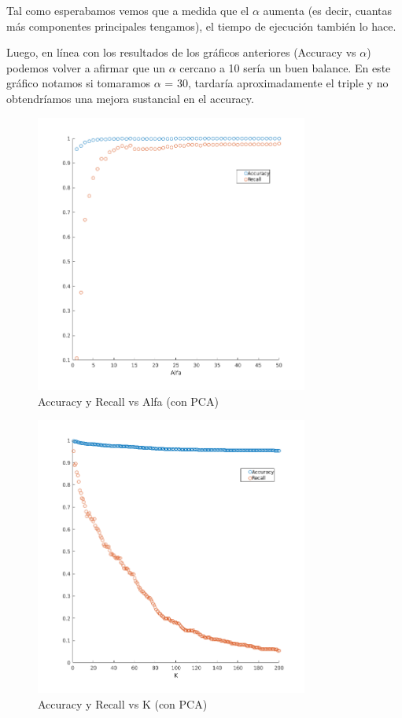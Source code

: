 Tal como esperabamos vemos que a medida que el $\alpha$ aumenta (es decir, cuantas más componentes principales tengamos), el tiempo de ejecución también lo hace.

Luego, en línea con los resultados de los gráficos anteriores (Accuracy vs $\alpha$) podemos volver a afirmar que un $\alpha$ cercano a 10 sería un buen balance. En este gráfico notamos si tomaramos $\alpha$ = 30, tardaría aproximadamente el triple y no obtendríamos una mejora sustancial en el accuracy.
\begin{figure}[H]
	\centering
	\includegraphics[width=0.8\textwidth]{img/Acc_recall_alfa_pca.png}
	\caption{Accuracy y Recall vs Alfa (con PCA)}
	\label{fig: Accuracy y Recall vs Alfa (con PCA)}
\end{figure}

\begin{figure}[H]
	\centering
	\includegraphics[width=0.8\textwidth]{img/Acc_recall_k_pca.png}
	\caption{Accuracy y Recall vs K (con PCA)}
	\label{fig: Accuracy y Recall vs K (con PCA)}
\end{figure}

